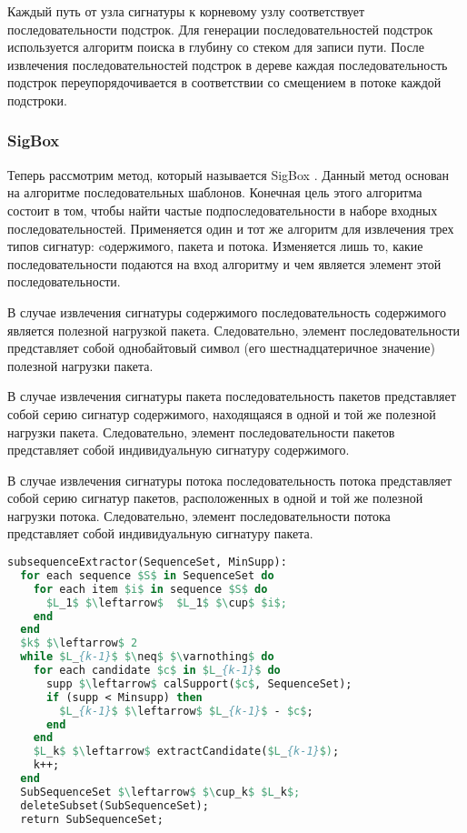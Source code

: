 Каждый путь от узла сигнатуры к корневому узлу соответствует последовательности подстрок.
Для генерации последовательностей подстрок используется алгоритм поиска в глубину со стеком для записи пути.
После извлечения последовательностей подстрок в дереве каждая последовательность подстрок
переупорядочивается в соответствии со смещением в потоке каждой подстроки.

\subsubsection{SigBox}

Теперь рассмотрим метод, который называется SigBox \cite{shim2017sigbox}. Данный метод основан на алгоритме последовательных шаблонов.
Конечная цель этого алгоритма состоит в том, чтобы найти частые подпоследовательности в наборе входных последовательностей.
Применяется один и тот же алгоритм для извлечения трех типов сигнатур: cодержимого, пакета и потока. Изменяется лишь то, какие последовательности
подаются на вход алгоритму и чем является элемент этой последовательности.

В случае извлечения сигнатуры содержимого последовательность содержимого является полезной нагрузкой пакета.
Следовательно, элемент последовательности представляет собой однобайтовый символ (его шестнадцатеричное значение) полезной нагрузки пакета.

В случае извлечения сигнатуры пакета последовательность пакетов представляет собой серию сигнатур содержимого, находящаяся в одной и той же полезной нагрузки пакета.
Следовательно, элемент последовательности пакетов представляет собой индивидуальную сигнатуру содержимого.

В случае извлечения сигнатуры потока последовательность потока представляет собой серию сигнатур пакетов, расположенных в одной и той же полезной нагрузки потока.
Следовательно, элемент последовательности потока представляет собой индивидуальную сигнатуру пакета.


\begin{lstlisting}[language=Pascal, caption=Алгоритм выделения подпоследовательности, mathescape]
subsequenceExtractor(SequenceSet, MinSupp):
  for each sequence $S$ in SequenceSet do
    for each item $i$ in sequence $S$ do
      $L_1$ $\leftarrow$  $L_1$ $\cup$ $i$;
    end
  end
  $k$ $\leftarrow$ 2
  while $L_{k-1}$ $\neq$ $\varnothing$ do
    for each candidate $c$ in $L_{k-1}$ do
      supp $\leftarrow$ calSupport($c$, SequenceSet);
      if (supp < Minsupp) then
        $L_{k-1}$ $\leftarrow$ $L_{k-1}$ - $c$;
      end
    end
    $L_k$ $\leftarrow$ extractCandidate($L_{k-1}$);
    k++;
  end
  SubSequenceSet $\leftarrow$ $\cup_k$ $L_k$;
  deleteSubset(SubSequenceSet);
  return SubSequenceSet;
\end{lstlisting}

